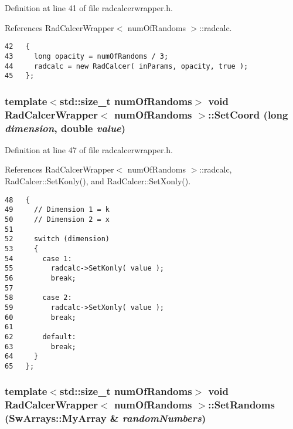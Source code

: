 Definition at line 41 of file radcalcerwrapper.h.

References RadCalcerWrapper$<$ numOfRandoms $>$::radcalc.

\begin{Code}\begin{verbatim}42   {
43     long opacity = numOfRandoms / 3;
44     radcalc = new RadCalcer( inParams, opacity, true );
45   };
\end{verbatim}
\end{Code}


\subsubsection{\setlength{\rightskip}{0pt plus 5cm}template$<$std::size\_\-t numOfRandoms$>$ void {\bf RadCalcerWrapper}$<$ numOfRandoms $>$::SetCoord (long {\em dimension}, double {\em value})\hspace{0.3cm}{\tt  [inline]}}\label{classRadCalcerWrapper_0ef1a476bcef6bdf397fc6e5f11fe13f}




Definition at line 47 of file radcalcerwrapper.h.

References RadCalcerWrapper$<$ numOfRandoms $>$::radcalc, RadCalcer::SetKonly(), and RadCalcer::SetXonly().

\begin{Code}\begin{verbatim}48   {
49     // Dimension 1 = k
50     // Dimension 2 = x
51 
52     switch (dimension)
53     {
54       case 1:
55         radcalc->SetKonly( value );
56         break;
57 
58       case 2:
59         radcalc->SetXonly( value );
60         break;
61 
62       default:
63         break;
64     }
65   };
\end{verbatim}
\end{Code}


\subsubsection{\setlength{\rightskip}{0pt plus 5cm}template$<$std::size\_\-t numOfRandoms$>$ void {\bf RadCalcerWrapper}$<$ numOfRandoms $>$::SetRandoms ({\bf SwArrays::MyArray} \& {\em randomNumbers})\hspace{0.3cm}{\tt  [inline]}}\label{classRadCalcerWrapper_fef9ee4382b675b0e0d23d8db820ee72}




